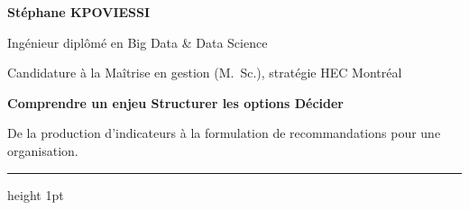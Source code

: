 \documentclass[10pt,a4paper]{article}
\begin{document}
\fontsize{10pt}{12.3pt}\selectfont
\sloppy

\begin{minipage}[t]{0.52\textwidth}
{\LARGE\bfseries\color{accentdark} Stéphane KPOVIESSI}\par
\vspace{1pt}
{\large\color{accent}Ingénieur diplômé en Big Data \& Data Science}\par
\vspace{1pt}
{\color{muted}Candidature à la Maîtrise en gestion (M.~Sc.), stratégie \textbullet{} HEC Montréal}
\end{minipage}
\hfill
\begin{minipage}[t]{0.42\textwidth}
\raggedleft
\vspace{2pt}
{\normalsize\bfseries\color{accent}Comprendre un enjeu \textbullet{} Structurer les options \textbullet{} Décider}\par
\vspace{3pt}
{\small\color{muted}
De la production d'indicateurs à la formulation de recommandations pour une organisation.
}
\end{minipage}

\vspace{5pt}
{\color{rule}\hrule height 1pt}
\vspace{6pt}
\end{document}

